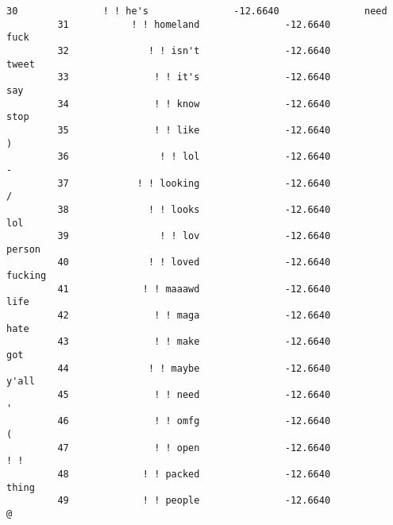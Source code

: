 \documentclass[11pt]{article}
\begin{document}
\begin{Verbatim}[commandchars=\\\{\}]
         30               ! ! he's               -12.6640               need   
         31           ! ! homeland               -12.6640               fuck   
         32              ! ! isn't               -12.6640              tweet   
         33               ! ! it's               -12.6640                say   
         34               ! ! know               -12.6640               stop   
         35               ! ! like               -12.6640                  )   
         36                ! ! lol               -12.6640                  -   
         37            ! ! looking               -12.6640                  /   
         38              ! ! looks               -12.6640                lol   
         39                ! ! lov               -12.6640             person   
         40              ! ! loved               -12.6640            fucking   
         41             ! ! maaawd               -12.6640               life   
         42               ! ! maga               -12.6640               hate   
         43               ! ! make               -12.6640                got   
         44              ! ! maybe               -12.6640              y'all   
         45               ! ! need               -12.6640                  '   
         46               ! ! omfg               -12.6640                  (   
         47               ! ! open               -12.6640                ! !   
         48             ! ! packed               -12.6640              thing   
         49             ! ! people               -12.6640                  @   
         

\end{Verbatim}
\end{document}
